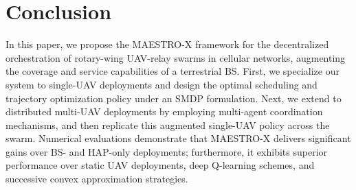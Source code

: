\documentclass[12pt, draftcls, onecolumn]{IEEEtran}
\theoremstyle{plain}
\theoremstyle{definition}
\theoremstyle{remark}
\begin{document}
\section{Conclusion}\label{S7}
In this paper, we propose the MAESTRO-X framework for the decentralized orchestration of rotary-wing UAV-relay swarms in cellular networks, augmenting the coverage and service capabilities of a terrestrial BS. First, we specialize our system to single-UAV deployments and design the optimal scheduling and trajectory optimization policy under an SMDP formulation. Next, we extend to distributed multi-UAV deployments by employing multi-agent coordination mechanisms, and then replicate this augmented single-UAV policy across the swarm. Numerical evaluations demonstrate that MAESTRO-X delivers significant gains over BS- and HAP-only deployments; furthermore, it exhibits superior performance over static UAV deployments, deep Q-learning schemes, and successive convex approximation strategies.
\vspace{-4mm}
\end{document}
